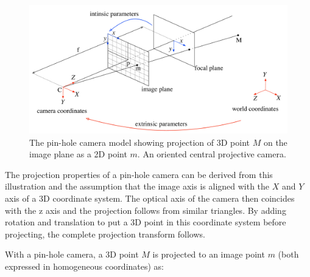 \begin{figure}[ht]
	\begin{center}
		\includegraphics[keepaspectratio,width=\textwidth]{fig/camera-model.pdf}
	\end{center}
	\caption{The pin-hole camera model showing projection of 3D point $M$ on the image plane as a 2D point $m$. An oriented central projective camera.}
	\label{fig:cameramodel}
\end{figure}

The projection properties of a pin-hole camera can be derived from this illustration and the assumption that the image axis is aligned with the $X$ and $Y$ axis of a 3D coordinate system. The optical axis of the camera then coincides with the z axis and the projection follows from similar triangles. By adding rotation and translation to put a 3D point in this coordinate system before projecting, the complete projection transform follows.

With a pin-hole camera, a 3D point $M$ is projected to an image point $m$ (both expressed in homogeneous coordinates) as:

